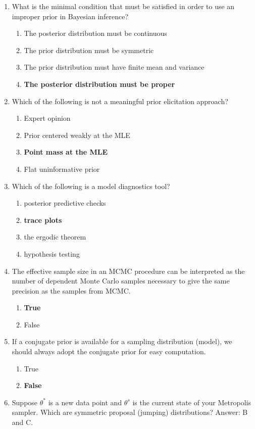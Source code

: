 \documentclass[12pt]{article}
\begin{document}
\begin{enumerate}
\item What is the minimal condition that must be satisfied in order to use an improper prior in Bayesian inference?
\begin{enumerate}
\item The posterior distribution must be continuous
\item  The prior distribution must be symmetric
\item  The prior distribution must have finite mean and variance
\item \textbf{The posterior distribution must be proper}
\end{enumerate}
\item Which of the following is not a meaningful prior elicitation approach?
\begin{enumerate}
\item Expert opinion
\item Prior centered weakly at the MLE
\item \textbf{Point mass at the MLE}
\item Flat uninformative prior
\end{enumerate}
\item Which of the following is a model diagnostics tool?
\begin{enumerate}
\item posterior predictive checks 
\item \textbf{trace plots}
\item the ergodic theorem
\item hypothesis testing
\end{enumerate}
\item The effective sample size in an MCMC procedure can be interpreted as the number of dependent Monte Carlo samples necessary to give the same precision as the samples from MCMC.
\begin{enumerate}
\item \textbf{True}
\item False 
\end{enumerate}
\item If a conjugate prior is available for a sampling distribution (model), we should always adopt the conjugate prior for easy computation.
\begin{enumerate}
\item True
\item \textbf{False}
\end{enumerate}
\item Suppose $\theta^*$ is a new data point and $\theta^{s}$ is the current state of your Metropolis sampler. Which are symmetric proposal (jumping) distributions? Answer: B and C.

\end{enumerate}
\end{document}
